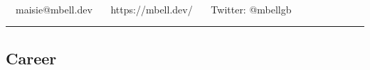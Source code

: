 \documentclass[11pt,a4paper]{article}
\begin{document}
\begin{center}
{\Huge {}}\\


\ \ maisie@mbell.dev \textbullet\
\ \ https://mbell.dev/ \textbullet\
\ \ Twitter: @mbellgb
\end{center}


\hrule
\vspace{-1.2em}
\subsection*{Career}
\end{document}
